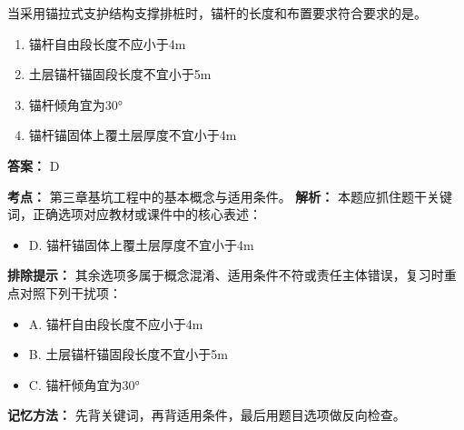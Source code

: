 \documentclass[UTF8,fontset=fandol,11pt]{ctexart}
\begin{document}
\begin{quizbox}[title={第 2 题}]
当采用锚拉式支护结构支撑排桩时，锚杆的长度和布置要求符合要求的是。\\
\begin{enumerate}[label=\Alph*.]
\item 锚杆自由段长度不应小于4m
\item 土层锚杆锚固段长度不宜小于5m
\item 锚杆倾角宜为30°
\item 锚杆锚固体上覆土层厚度不宜小于4m
\end{enumerate}
\textbf{答案：} D
\vspace{0.25em}
\begin{answerbox}[title={考点解析}]
\textbf{考点：} 第三章基坑工程中的基本概念与适用条件。
\textbf{解析：} 本题应抓住题干关键词，正确选项对应教材或课件中的核心表述：
\begin{itemize}
\item D. 锚杆锚固体上覆土层厚度不宜小于4m
\end{itemize}
\textbf{排除提示：} 其余选项多属于概念混淆、适用条件不符或责任主体错误，复习时重点对照下列干扰项：
\begin{itemize}
\item A. 锚杆自由段长度不应小于4m
\item B. 土层锚杆锚固段长度不宜小于5m
\item C. 锚杆倾角宜为30°
\end{itemize}
\textbf{记忆方法：} 先背关键词，再背适用条件，最后用题目选项做反向检查。
\end{answerbox}
\end{quizbox}
\end{document}
